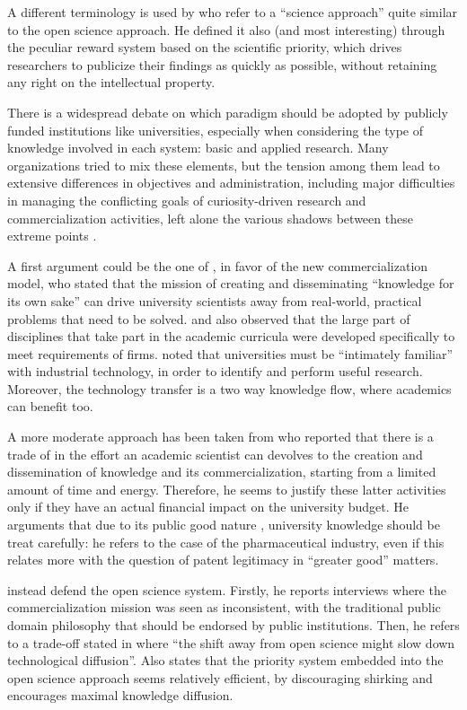 A different terminology is used by \citet{Stern2004} who refer to a \enquote{science approach} quite similar to the open science approach. He defined it also (and most interesting) through the peculiar reward system based on the scientific priority, which drives researchers to publicize their findings as quickly as possible, without retaining any right on the intellectual property. 

There is a widespread debate on which paradigm should be adopted by publicly funded institutions like universities, especially when considering the type of knowledge involved in each system: basic and applied research. Many organizations tried to mix these elements, but the tension among them lead to extensive differences in objectives and administration, including major difficulties in managing the conflicting goals of curiosity-driven research and commercialization activities, left alone the various shadows between these extreme points \citep{Rasmussen2006}.

A first argument could be the one of \citet{Geuna2009}, in favor of the new commercialization model, who stated that the mission of creating and disseminating \enquote{knowledge for its own sake} can drive university scientists away from real-world, practical problems that need to be solved. \citet{Rosenberg1994} and \citet{Nelson1998} also observed that the large part of disciplines that take part in the academic curricula were developed specifically to meet requirements of firms. \citet{Balconi2006} noted that universities must be \enquote{intimately familiar} with industrial technology, in order to identify and perform useful research. Moreover, the technology transfer is a two way knowledge flow, where academics can benefit too.

A more moderate approach has been taken from \citet{Beath2000} who reported that there is a trade of in the effort an academic scientist can devolves to the creation and dissemination of knowledge and its commercialization, starting from a limited amount of time and energy. Therefore, he seems to justify these latter activities only if they have an actual financial impact on the university budget. He arguments that due to its public good nature \citep{Muscio2013}, university knowledge should be treat carefully: he refers to the case of the pharmaceutical industry, even if this relates more with the question of patent legitimacy in \enquote{greater good} matters.

\citet{Siegel2003a} instead defend the open science system. Firstly, he reports interviews where the commercialization mission was seen as inconsistent, with the traditional public domain philosophy that should be endorsed by public institutions. Then, he refers to a trade-off stated in \citet{Nelson2001} where \enquote{the shift away from open science might slow down technological diffusion}. Also \citet{Stern2004} states that the priority system embedded into the open science approach seems relatively efficient, by discouraging shirking and encourages maximal knowledge diffusion.

